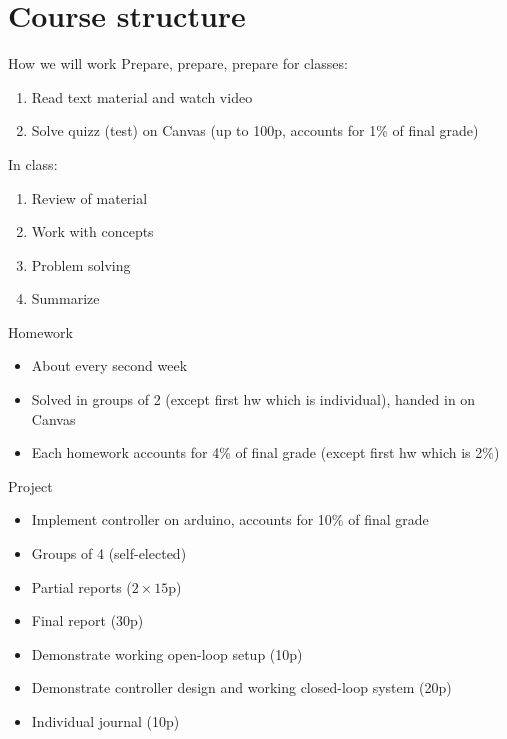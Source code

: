 \documentclass[presentation,aspectratio=169]{beamer}
\begin{document}
\section{Course structure}
\label{sec-6}
\begin{frame}[label=sec-6-1]{How we will work}
\alert{Prepare, prepare, prepare} for classes:
\begin{enumerate}
\item Read text material and watch video
\item Solve quizz (test) on Canvas (up to 100p, accounts for 1\% of final grade)
\end{enumerate}
In class:
\begin{enumerate}
\item Review of material
\item Work with concepts
\item Problem solving
\item Summarize
\end{enumerate}
\end{frame}

\begin{frame}[label=sec-6-2]{Homework}
\begin{itemize}
\item About every second week
\item Solved in groups of 2 (except first hw which is individual), handed in on Canvas
\item Each homework accounts for 4\% of final grade (except first hw which is 2\%)
\end{itemize}
\end{frame}

\begin{frame}[label=sec-6-3]{Project}
\begin{itemize}
\item Implement controller on arduino, accounts for 10\% of final grade
\item Groups of 4 (self-elected)
\item Partial reports (\(2\times 15\)p)
\item Final report (30p)
\item Demonstrate working open-loop setup (10p)
\item Demonstrate controller design and  working closed-loop system (20p)
\item Individual journal (10p)
\end{itemize}
\end{frame}
\end{document}
